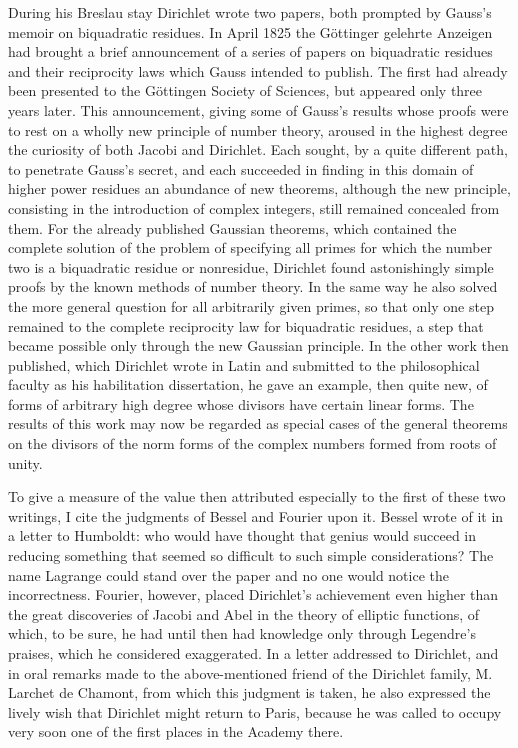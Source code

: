 \documentclass[11pt]{article}
\begin{document}
During his Breslau stay Dirichlet wrote two papers, both prompted by Gauss's memoir on biquadratic residues. In April 1825 the Göttinger gelehrte Anzeigen had brought a brief announcement of a series of papers on biquadratic residues and their reciprocity laws which Gauss intended to publish. The first had already been presented to the Göttingen Society of Sciences, but appeared only three years later. This announcement, giving some of Gauss's results whose proofs were to rest on a wholly new principle of number theory, aroused in the highest degree the curiosity of both Jacobi and Dirichlet. Each sought, by a quite different path, to penetrate Gauss's secret, and each succeeded in finding in this domain of higher power residues an abundance of new theorems, although the new principle, consisting in the introduction of complex integers, still remained concealed from them. For the already published Gaussian theorems, which contained the complete solution of the problem of specifying all primes for which the number two is a biquadratic residue or nonresidue, Dirichlet found astonishingly simple proofs by the known methods of number theory. In the same way he also solved the more general question for all arbitrarily given primes, so that only one step remained to the complete reciprocity law for biquadratic residues, a step that became possible only through the new Gaussian principle. In the other work then published, which Dirichlet wrote in Latin and submitted to the philosophical faculty as his habilitation dissertation, he gave an example, then quite new, of forms of arbitrary high degree whose divisors have certain linear forms. The results of this work may now be regarded as special cases of the general theorems on the divisors of the norm forms of the complex numbers formed from roots of unity.

To give a measure of the value then attributed especially to the first of these two writings, I cite the judgments of Bessel and Fourier upon it. Bessel wrote of it in a letter to Humboldt: who would have thought that genius would succeed in reducing something that seemed so difficult to such simple considerations? The name Lagrange could stand over the paper and no one would notice the incorrectness. Fourier, however, placed Dirichlet's achievement even higher than the great discoveries of Jacobi and Abel in the theory of elliptic functions, of which, to be sure, he had until then had knowledge only through Legendre's praises, which he considered exaggerated. In a letter addressed to Dirichlet, and in oral remarks made to the above-mentioned friend of the Dirichlet family, M. Larchet de Chamont, from which this judgment is taken, he also expressed the lively wish that Dirichlet might return to Paris, because he was called to occupy very soon one of the first places in the Academy there.
\end{document}
